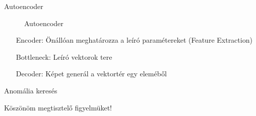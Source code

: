 \documentclass[aspectratio=169]{beamer}
\begin{document}
\begin{frame}{Autoencoder}
\begin{figure}
\begin{subfigure}{0.2\textwidth}
        \end{subfigure}
        \caption*{Autoencoder\footnotemark}
    \end{figure}
    \begin{itemize}
        \setlength{\itemindent}{4em}
        \item [Encoder:] Önállóan meghatározza a leíró paramétereket (Feature Extraction)
        \item [Bottleneck:] Leíró vektorok tere
        \item [Decoder:] Képet generál a vektortér egy eleméből
    \end{itemize}
\end{frame}

\begin{frame}{Anomália keresés}

\end{frame}

\begin{frame}
    \centering \Large
    Köszönöm megtisztelő figyelmüket!
\end{frame}
\end{document}
